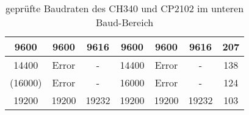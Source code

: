 \begin{table}[H]
\begin{center}
\begin{tabular}{| c | c | c || c | c | c || c |}
    \hline
       9600    & 9600  &   9616    &   9600    &  9600  &   9616    &   207  \\
    \hline
      14400    & Error &   -       &  14400    & Error  &    -      &   138  \\
    \hline
     (16000)   & Error &   -       &  16000    & Error  &    -      &   124  \\
    \hline
      19200    & 19200  &  19232   &   19200   &  19200 &  19232    &   103  \\
    \hline
    \end{tabular}
  \end{center}
  \caption{geprüfte Baudraten des CH340 und CP2102 im unteren Baud-Bereich}
  \label{tab:CH340baudl}
\end{table}
 



